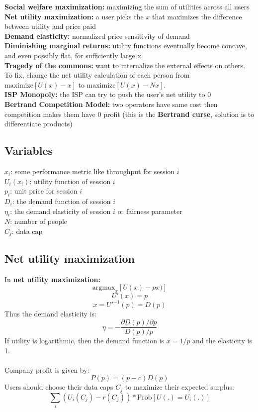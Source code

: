 \documentclass{article}
\begin{document}
\textbf{Social welfare maximization:} maximizing the sum of utilities across all users \\
\textbf{Net utility maximization:} a user picks the $x$ that maximizes the difference between utility and price paid \\
\textbf{Demand elasticity:} normalized price sensitivity of demand \\
\textbf{Diminishing marginal returns:} utility functions eventually become concave, and even possibly flat, for sufficiently large x \\
\textbf{Tragedy of the commons:} want to internalize the external effects on others. 
To fix, change the net utility calculation of each person from $\text{maximize}[U(x) - x]$ to $\text{maximize}[U(x) - Nx]$. \\
\textbf{ISP Monopoly:} the ISP can try to push the user's net utility to 0 \\
\textbf{Bertrand Competition Model:} two operators have same cost then competition makes them have 0 profit (this is the \textbf{Bertrand curse}, solution is to differentiate products)

\subsection{Variables}

$x_i$: some performance metric like throughput for session $i$ \\
$U_i(x_i)$: utility function of session $i$ \\
$p_i$: unit price for session $i$ \\
$D_i$: the demand function of session $i$ \\
$\eta_i$: the demand elasticity of session $i$
$\alpha$: fairness parameter \\
$N$: number of people \\
$C_j$: data cap

\subsection{Net utility maximization}

In \textbf{net utility maximization:}
$$ \text{argmax}_x[U(x) - px)] $$
$$ U'(x) = p $$
$$ x = U'^{-1}(p) = D(p) $$
Thus the demand elasticity is:
$$ \eta = -\frac{\partial D(p)/\partial p}{D(p)/p} $$
If utility is logarithmic, then the demand function is $x = 1/p$ and the elasticity is 1. \\
\\
Company profit is given by:
$$ P(p) = (p - c)D(p) $$
Users should choose their data caps $C_j$ to maximize their expected surplus:
$$ \sum_i \left(U_i(C_j) - r(C_j)\right)*\text{Prob}[U(.) = U_i(.)] $$
\end{document}
